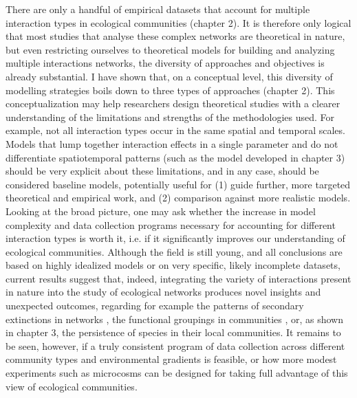 There are only a handful of empirical datasets that account for multiple interaction types in ecological communities (chapter 2). It is therefore only logical that most studies that analyse these complex networks are theoretical in nature, but even restricting ourselves to theoretical models for building and analyzing multiple interactions networks, the diversity of approaches and objectives is already substantial. I have shown that, on a conceptual level, this diversity of modelling strategies boils down to three types of approaches (chapter 2). This conceptualization may help researchers design theoretical studies with a clearer understanding of the limitations and strengths of the methodologies used. For example, not all interaction types occur in the same spatial and temporal scales. Models that lump together interaction effects in a single parameter and do not differentiate spatiotemporal patterns (such as the model developed in chapter 3) should be very explicit about these limitations, and in any case, should be considered baseline models, potentially useful for (1) guide further, more targeted theoretical and empirical work, and (2) comparison against more realistic models. Looking at the broad picture, one may ask whether the increase in model complexity and data collection programs necessary for accounting for different interaction types is worth it, i.e. if it significantly improves our understanding of ecological communities. Although the field is still young, and all conclusions are based on highly idealized models or on very specific, likely incomplete datasets, current results suggest that, indeed, integrating the variety of interactions present in nature into the study of ecological networks produces novel insights and unexpected outcomes, regarding for example the patterns of secondary extinctions in networks \citep{Pocock2012,Evans2013a}, the functional groupings in communities \citep{Kefi2016a}, or, as shown in chapter 3, the persistence of species in their local communities. It remains to be seen, however, if a truly consistent program of data collection across different community types and environmental gradients is feasible, or how more modest experiments such as microcosms can be designed for taking full advantage of this view of ecological communities.

